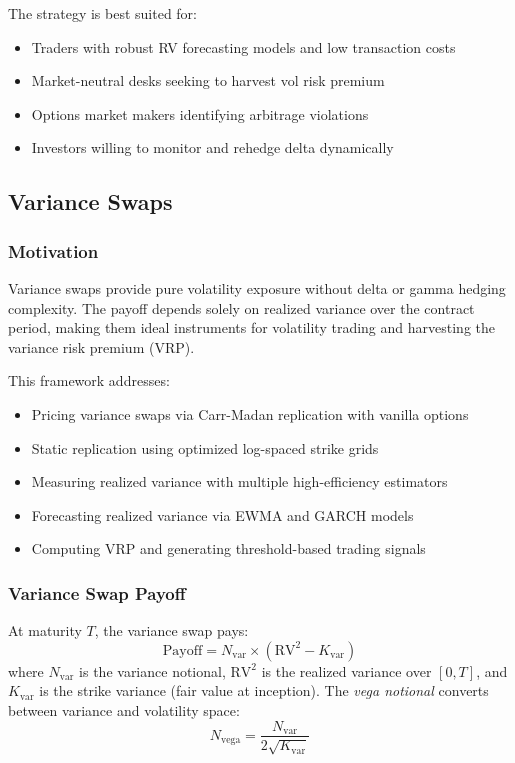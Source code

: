 The strategy is best suited for:
\begin{itemize}
  \item Traders with robust RV forecasting models and low transaction costs
  \item Market-neutral desks seeking to harvest vol risk premium
  \item Options market makers identifying arbitrage violations
  \item Investors willing to monitor and rehedge delta dynamically
\end{itemize}

\subsection{Variance Swaps}

\subsubsection{Motivation}

Variance swaps provide pure volatility exposure without delta or gamma hedging complexity. The payoff depends solely on realized variance over the contract period, making them ideal instruments for volatility trading and harvesting the variance risk premium (VRP).

This framework addresses:
\begin{itemize}
  \item Pricing variance swaps via Carr-Madan replication with vanilla options
  \item Static replication using optimized log-spaced strike grids
  \item Measuring realized variance with multiple high-efficiency estimators
  \item Forecasting realized variance via EWMA and GARCH models
  \item Computing VRP and generating threshold-based trading signals
\end{itemize}

\subsubsection{Variance Swap Payoff}

At maturity $T$, the variance swap pays:
\[
\text{Payoff} = N_{\text{var}} \times (\text{RV}^2 - K_{\text{var}})
\]
where $N_{\text{var}}$ is the variance notional, $\text{RV}^2$ is the realized variance over $[0, T]$, and $K_{\text{var}}$ is the strike variance (fair value at inception). The \emph{vega notional} converts between variance and volatility space:
\[
N_{\text{vega}} = \frac{N_{\text{var}}}{2 \sqrt{K_{\text{var}}}}
\]

